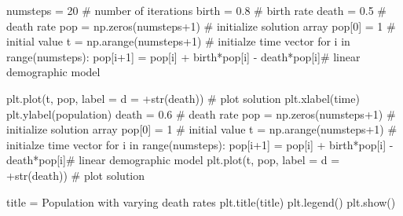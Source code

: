 \documentclass[
  letterpaper,
  DIV=11,
  numbers=noendperiod]{scrreprt}
\newenvironment{Shaded}{\begin{snugshade}}{\end{snugshade}}
\newcommand{\BuiltInTok}[1]{\textcolor[rgb]{0.00,0.23,0.31}{#1}}
\newcommand{\CommentTok}[1]{\textcolor[rgb]{0.37,0.37,0.37}{#1}}
\newcommand{\ControlFlowTok}[1]{\textcolor[rgb]{0.00,0.23,0.31}{#1}}
\newcommand{\DecValTok}[1]{\textcolor[rgb]{0.68,0.00,0.00}{#1}}
\newcommand{\FloatTok}[1]{\textcolor[rgb]{0.68,0.00,0.00}{#1}}
\newcommand{\KeywordTok}[1]{\textcolor[rgb]{0.00,0.23,0.31}{#1}}
\newcommand{\NormalTok}[1]{\textcolor[rgb]{0.00,0.23,0.31}{#1}}
\newcommand{\OperatorTok}[1]{\textcolor[rgb]{0.37,0.37,0.37}{#1}}
\newcommand{\StringTok}[1]{\textcolor[rgb]{0.13,0.47,0.30}{#1}}
\begin{document}
\begin{Shaded}
\begin{Highlighting}[]
\NormalTok{numsteps }\OperatorTok{=} \DecValTok{20} \CommentTok{\# number of iterations}
\NormalTok{birth }\OperatorTok{=} \FloatTok{0.8} \CommentTok{\# birth rate}
\NormalTok{death }\OperatorTok{=}  \FloatTok{0.5} \CommentTok{\# death rate}
\NormalTok{pop }\OperatorTok{=}\NormalTok{ np.zeros(numsteps}\OperatorTok{+}\DecValTok{1}\NormalTok{) }\CommentTok{\# initialize solution array}
\NormalTok{pop[}\DecValTok{0}\NormalTok{] }\OperatorTok{=} \DecValTok{1} \CommentTok{\# initial value }
\NormalTok{t }\OperatorTok{=}\NormalTok{ np.arange(numsteps}\OperatorTok{+}\DecValTok{1}\NormalTok{) }\CommentTok{\# initialze time vector}
\ControlFlowTok{for}\NormalTok{ i }\KeywordTok{in} \BuiltInTok{range}\NormalTok{(numsteps):}
\NormalTok{     pop[i}\OperatorTok{+}\DecValTok{1}\NormalTok{] }\OperatorTok{=}\NormalTok{ pop[i] }\OperatorTok{+}\NormalTok{ birth}\OperatorTok{*}\NormalTok{pop[i] }\OperatorTok{{-}}\NormalTok{ death}\OperatorTok{*}\NormalTok{pop[i]}\CommentTok{\# linear demographic model}

\NormalTok{plt.plot(t, pop, label }\OperatorTok{=} \StringTok{\textquotesingle{}d = \textquotesingle{}}\OperatorTok{+}\BuiltInTok{str}\NormalTok{(death)) }\CommentTok{\# plot solution}
\NormalTok{plt.xlabel(}\StringTok{\textquotesingle{}time\textquotesingle{}}\NormalTok{)}
\NormalTok{plt.ylabel(}\StringTok{\textquotesingle{}population\textquotesingle{}}\NormalTok{)}
\NormalTok{death }\OperatorTok{=}  \FloatTok{0.6} \CommentTok{\# death rate}
\NormalTok{pop }\OperatorTok{=}\NormalTok{ np.zeros(numsteps}\OperatorTok{+}\DecValTok{1}\NormalTok{) }\CommentTok{\# initialize solution array}
\NormalTok{pop[}\DecValTok{0}\NormalTok{] }\OperatorTok{=} \DecValTok{1} \CommentTok{\# initial value }
\NormalTok{t }\OperatorTok{=}\NormalTok{ np.arange(numsteps}\OperatorTok{+}\DecValTok{1}\NormalTok{) }\CommentTok{\# initialze time vector}
\ControlFlowTok{for}\NormalTok{ i }\KeywordTok{in} \BuiltInTok{range}\NormalTok{(numsteps):}
\NormalTok{     pop[i}\OperatorTok{+}\DecValTok{1}\NormalTok{] }\OperatorTok{=}\NormalTok{ pop[i] }\OperatorTok{+}\NormalTok{ birth}\OperatorTok{*}\NormalTok{pop[i] }\OperatorTok{{-}}\NormalTok{ death}\OperatorTok{*}\NormalTok{pop[i]}\CommentTok{\# linear demographic model}
\NormalTok{plt.plot(t, pop, label }\OperatorTok{=} \StringTok{\textquotesingle{}d = \textquotesingle{}}\OperatorTok{+}\BuiltInTok{str}\NormalTok{(death)) }\CommentTok{\# plot solution}

\NormalTok{title }\OperatorTok{=} \StringTok{\textquotesingle{}Population with varying death rates\textquotesingle{}}
\NormalTok{plt.title(title) }
\NormalTok{plt.legend()}
\NormalTok{plt.show()}
\end{Highlighting}
\end{Shaded}
\end{document}
